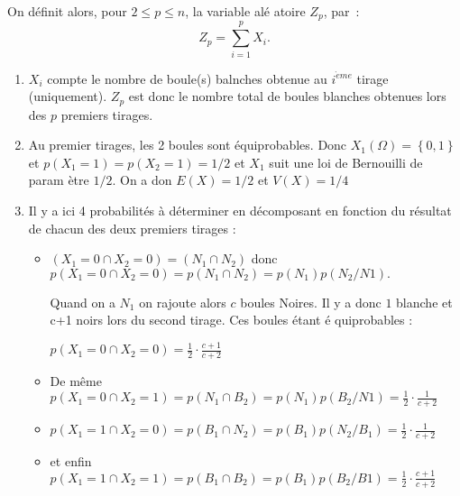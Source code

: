 \begin{correction}
On d\'{e}finit alors, pour $2\leqslant p\leqslant n$, la variable al\'{e}%
atoire $Z_{p}$, par~: 
\begin{equation*}
Z_{p}=\sum_{i=1}^{p}X_{i}.
\end{equation*}

\begin{enumerate}
\item $X_{i}$ compte le nombre de boule(s) balnches obtenue au $i^{\grave{e}%
me}$ tirage (uniquement). $Z_{p}$ est donc le nombre total de boules
blanches obtenues lors des $p$ premiers tirages.

\item Au premier tirages, les 2 boules sont \'{e}quiprobables. Donc $%
X_{1}\left( \Omega \right) =\left\{ 0,1\right\} $ et $p\left( X_{1}=1\right)
=p\left( X_{2}=1\right) =1/2$ et $X_{1}$ suit une loi de Bernouilli de param%
\`{e}tre $1/2.$ On a don $E\left( X\right) =1/2$ et $V\left( X\right) =1/4$

\item Il y a ici 4 probabilit\'{e}s \`{a} d\'{e}terminer en d\'{e}composant
en fonction du r\'{e}sultat de chacun des deux premiers tirages :

\begin{itemize}
\item $\left( X_{1}=0\cap X_{2}=0\right) =\left( N_{1}\cap N_{2}\right) $
donc $p\left( X_{1}=0\cap X_{2}=0\right) =p\left( N_{1}\cap N_{2}\right)
=p\left( N_{1}\right) p\left( N_{2}/N1\right) .$

Quand on a $N_{1}$ on rajoute alors $c$ boules Noires. Il y a donc $1$
blanche et c+1 noirs lors du second tirage. Ces boules \'{e}tant \'{e}%
quiprobables :

$p\left( X_{1}=0\cap X_{2}=0\right) =\displaystyle
\frac{1}{2}\cdot \frac{c+1}{c+2}$

\item De m\^{e}me $p\left( X_{1}=0\cap X_{2}=1\right) =p\left( N_{1}\cap
B_{2}\right) =p\left( N_{1}\right) p\left( B_{2}/N1\right) =\displaystyle
\frac{1}{2}\cdot \frac{1}{c+2}$

\item $p\left( X_{1}=1\cap X_{2}=0\right) =p\left( B_{1}\cap N_{2}\right)
=p\left( B_{1}\right) p\left( N_{2}/B_{1}\right) =\displaystyle
\frac{1}{2}\cdot \frac{1}{c+2}$

\item et enfin $p\left( X_{1}=1\cap X_{2}=1\right) =p\left( B_{1}\cap
B_{2}\right) =p\left( B_{1}\right) p\left( B_{2}/B1\right) =\displaystyle
\frac{1}{2}\cdot \frac{c+1}{c+2}$
\end{itemize}


\end{enumerate}
\end{correction}
